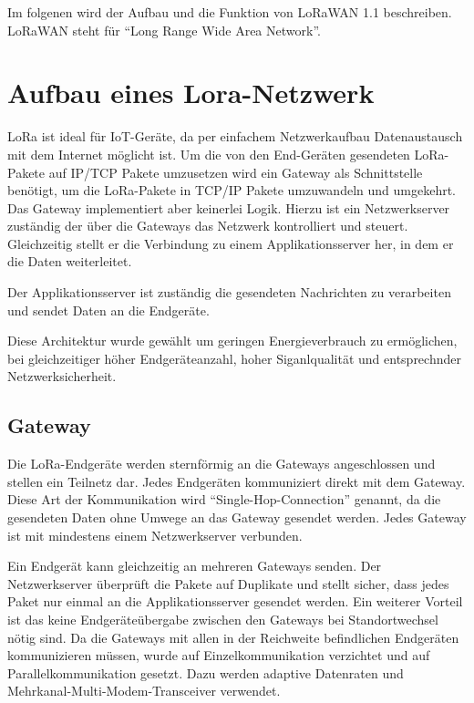 \documentclass[a4paper, 12pt]{article}
\begin{document}
        Im folgenen wird der Aufbau und die Funktion von LoRaWAN 1.1 beschreiben.\newline
        LoRaWAN steht für ``Long Range Wide Area Network''. \cite{WhatIsLoRa}

        
        
    \section{Aufbau eines Lora-Netzwerk}
        LoRa ist ideal für IoT-Geräte, da per einfachem Netzwerkaufbau Datenaustausch mit dem Internet möglicht ist.
        Um die von den End-Geräten gesendeten LoRa-Pakete auf IP/TCP Pakete umzusetzen wird ein Gateway als Schnittstelle
        benötigt, um die LoRa-Pakete in TCP/IP Pakete umzuwandeln und umgekehrt.
        Das Gateway implementiert aber keinerlei Logik. Hierzu ist ein Netzwerkserver zuständig der über die 
        Gateways das Netzwerk kontrolliert und steuert. Gleichzeitig stellt er die Verbindung zu einem 
        Applikationsserver her, in dem er die Daten weiterleitet.

        Der Applikationsserver ist zuständig die gesendeten Nachrichten zu verarbeiten und sendet Daten an die 
        Endgeräte.

        Diese Architektur wurde gewählt um geringen Energieverbrauch zu ermöglichen, bei gleichzeitiger 
        höher Endgeräteanzahl, hoher Siganlqualität und entsprechnder Netzwerksicherheit. \cite[S. 8 ff.]{WhatIsLoRa}
        
        \subsection{Gateway}
            Die LoRa-Endgeräte werden sternförmig an die Gateways angeschlossen und stellen ein Teilnetz dar. 
            Jedes Endgeräten kommuniziert direkt mit dem Gateway. Diese Art der Kommunikation wird  
            ``Single-Hop-Connection'' genannt, da die gesendeten Daten ohne Umwege an das Gateway gesendet werden. 
            Jedes Gateway ist mit mindestens einem Netzwerkserver verbunden.
        
            Ein Endgerät kann gleichzeitig an mehreren Gateways senden. Der Netzwerkserver überprüft die Pakete 
            auf Duplikate und stellt sicher, dass jedes Paket nur einmal an die Applikationsserver gesendet werden.
            Ein weiterer Vorteil ist das keine Endgeräteübergabe zwischen den Gateways bei Standortwechsel nötig sind.
            Da die Gateways mit allen in der Reichweite befindlichen Endgeräten kommunizieren müssen, wurde 
            auf Einzelkommunikation verzichtet und auf Parallelkommunikation gesetzt. 
            Dazu werden adaptive Datenraten und Mehrkanal-Multi-Modem-Transceiver verwendet.
        
\end{document}
